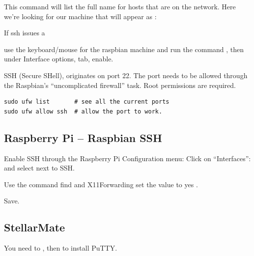 This command will list the full name for hosts that are on the network.
Here we're looking for our machine  that will appear
as :

{}

If ssh issues a 


use the keyboard/mouse for the raspbian machine and run the command
, then under Interface options,  tab, enable.


SSH (Secure SHell), originates on port 22. The port needs to be allowed
through the Raspbian's ``uncomplicated firewall''  task. Root
permissions are required.

\begingroup \fontsize{10pt}{10pt}
\selectfont
\begin{verbatim} 
sudo ufw list       # see all the current ports
sudo ufw allow ssh  # allow the port to work.
\end{verbatim}
\endgroup

\subsection{Raspberry Pi -- Raspbian SSH}

Enable SSH through the Raspberry Pi Configuration menu:
 Click on ``Interfaces'':
and select  next to SSH.

Use the command  find
and X11Forwarding set the value to yes .

Save.



\subsection{StellarMate}

You need to , then 
to install PuTTY.

